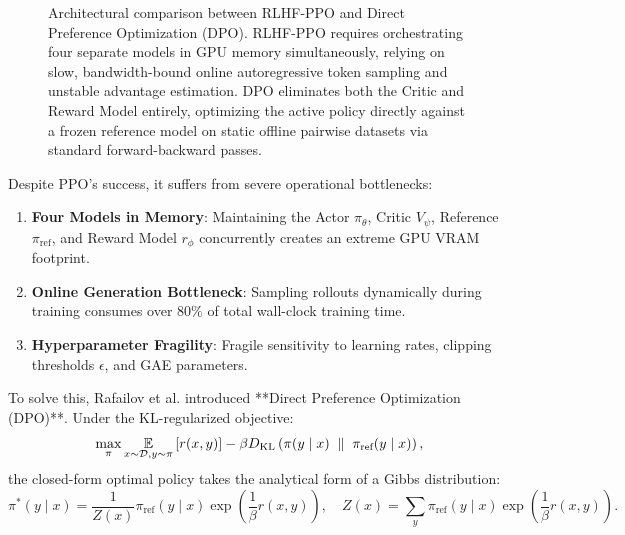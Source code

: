 \documentclass[../../main.tex]{subfiles}
\begin{document}
\begin{figure}[t]
\caption{Architectural comparison between RLHF-PPO and Direct Preference Optimization (DPO). RLHF-PPO requires orchestrating four separate models in GPU memory simultaneously, relying on slow, bandwidth-bound online autoregressive token sampling and unstable advantage estimation. DPO eliminates both the Critic and Reward Model entirely, optimizing the active policy directly against a frozen reference model on static offline pairwise datasets via standard forward-backward passes.}
\label{fig:ppo_vs_dpo_architecture}
\end{figure}

Despite PPO's success, it suffers from severe operational bottlenecks:
\begin{enumerate}
    \item \textbf{Four Models in Memory}: Maintaining the Actor $\pi_\theta$, Critic $V_\psi$, Reference $\pi_{\text{ref}}$, and Reward Model $r_\phi$ concurrently creates an extreme GPU VRAM footprint.
    \item \textbf{Online Generation Bottleneck}: Sampling rollouts dynamically during training consumes over $80\%$ of total wall-clock training time.
    \item \textbf{Hyperparameter Fragility}: Fragile sensitivity to learning rates, clipping thresholds $\epsilon$, and GAE parameters.
\end{enumerate}

To solve this, Rafailov et al. \citep{rafailov2023} introduced **Direct Preference Optimization (DPO)**. Under the KL-regularized objective:
\begin{equation}
\max_\pi \operatorname*{\mathbb{E}}_{x \sim \mathcal{D}, y \sim \pi} \left[ r(x, y) \right] - \beta D_{\mathrm{KL}}\left(\pi(y \mid x) \;\parallel\; \pi_{\text{ref}}(y \mid x)\right),
\end{equation}
the closed-form optimal policy takes the analytical form of a Gibbs distribution:
\begin{equation}
\label{eq:gibbs_optimal_policy}
\pi^*(y \mid x) = \frac{1}{Z(x)} \pi_{\text{ref}}(y \mid x) \exp\left( \frac{1}{\beta} r(x, y) \right), \quad Z(x) = \sum_y \pi_{\text{ref}}(y \mid x) \exp\left( \frac{1}{\beta} r(x, y) \right).
\end{equation}
\end{document}
